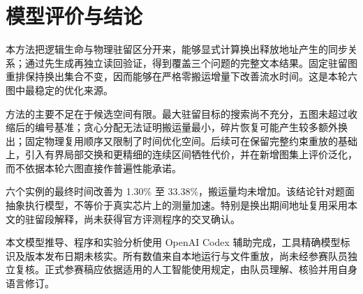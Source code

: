 \section{模型评价与结论}
本方法把逻辑生命与物理驻留区分开来，能够显式计算换出释放地址产生的同步关系；通过先生成再独立读回验证，得到覆盖三个问题的完整文本结果。固定驻留图重排保持换出集合不变，因而能够在严格零搬运增量下改善流水时间。这是本轮六图中最稳定的优化来源。

方法的主要不足在于候选空间有限。最大驻留目标的搜索尚不充分，五图未超过收缩后的编号基准；贪心分配无法证明搬运量最小，碎片恢复可能产生较多额外换出；固定物理复用顺序又限制了时间优化空间。后续可在保留完整约束重放的基础上，引入有界局部交换和更精细的连续区间牺牲代价，并在新增图集上评价泛化，而不依据本轮六图直接作普遍性能承诺。

六个实例的最终时间改善为 1.30\% 至 33.38\%，搬运量均未增加。该结论针对题面抽象执行模型，不等价于真实芯片上的测量加速。特别是换出期间地址复用采用本文的驻留段解释，尚未获得官方评测程序的交叉确认。

本文模型推导、程序和实验分析使用 OpenAI Codex 辅助完成，工具精确模型标识及版本发布日期未核实。所有数值来自本地运行与文件重放，尚未经参赛队员独立复核。正式参赛稿应依据适用的人工智能使用规定，由队员理解、核验并用自身语言修订\cite{ai}。
